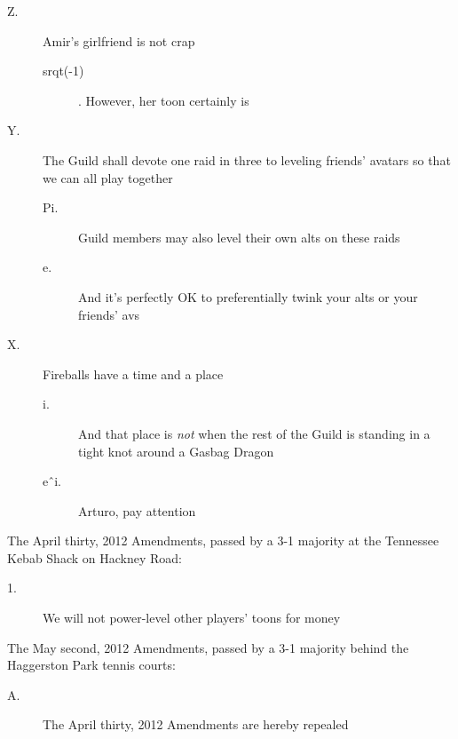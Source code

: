 \begin{description}
\item[Z.] Amir's girlfriend is not crap

\begin{description}
\item[srqt(-1)]. However, her toon certainly is 

\end{description}

\item[Y.] The Guild shall devote one raid in three to leveling friends' 
avatars so that we can all play together

\begin{description}
\item[Pi.] Guild members may also level their own 
alts on these raids 

\item[e.] And it's perfectly OK to preferentially 
twink your alts or your friends' avs 
\end{description}

\item[X.] Fireballs have a time and a place

\begin{description}
\item[i.] And that place is \emph{not} when the 
rest of the Guild is standing in a tight knot around a Gasbag Dragon 


\item[e{\^{~}}i.] Arturo, pay attention 

\end{description}
\end{description}

\tb

The April thirty, 2012 Amendments, passed by a 3-1 majority at the 
Tennessee Kebab Shack on Hackney Road:

\begin{description}
\item[1.] We will not power-level other players' toons for money
\end{description}

\tb

The May second, 2012 Amendments, passed by a 3-1 majority behind the 
Haggerston Park tennis courts:

\begin{description}
\item[A.] The April thirty, 2012 Amendments are hereby repealed
\end{description}

